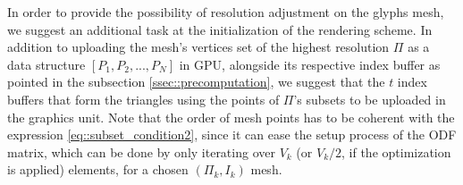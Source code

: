 \documentclass[twoside,twocolumn,10pt]{article}
\begin{document}





In order to provide the possibility of resolution adjustment on the glyphs mesh, we suggest an additional task at the initialization of the rendering scheme. In addition to uploading the mesh's vertices set of the highest resolution $\Pi$ as a data structure $[P_1, P_2, ..., P_N]$ in GPU, alongside its respective index buffer as pointed in the subsection \ref{ssec::precomputation}, we suggest that the $t$ index buffers that form the triangles using the points of $\Pi$'s subsets to be uploaded in the graphics unit. Note that the order of mesh points has to be coherent with the expression  \ref{eq::subset_condition2}, since it can ease the setup process of the ODF matrix, which can be done by only iterating over $V_k$ (or $V_k/2$, if the optimization is applied) elements, for a chosen $(\Pi_k, I_k)$ mesh.
\end{document}
